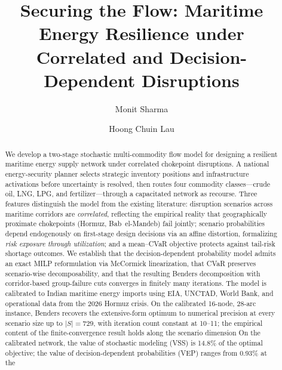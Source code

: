 \documentclass[final,3p,authoryear]{elsarticle}
\theoremstyle{definition}
\begin{document}
\begin{frontmatter}

\title{Securing the Flow: Maritime Energy Resilience under Correlated and Decision-Dependent Disruptions}

\author[addr1]{Monit Sharma}

\author[addr1]{Hoong Chuin Lau}

\address[addr1]{School of Computing and Information Systems,  Singapore Management University, Singapore}


\begin{abstract}
We develop a two-stage stochastic multi-commodity flow model for
designing a resilient maritime energy supply network under correlated
chokepoint disruptions. A national energy-security planner selects
strategic inventory positions and infrastructure activations before
uncertainty is resolved, then routes four commodity classes—crude oil,
LNG, LPG, and fertilizer—through a capacitated network as recourse.
Three features distinguish the model from the existing literature:
disruption scenarios across maritime corridors are \emph{correlated},
reflecting the empirical reality that geographically proximate
chokepoints (Hormuz, Bab~el-Mandeb) fail jointly; scenario probabilities
depend endogenously on first-stage design decisions via an affine
distortion, formalizing \emph{risk exposure through utilization}; and a
mean--CVaR objective protects against tail-risk shortage outcomes.
We establish that the decision-dependent probability model admits an
exact MILP reformulation via McCormick linearization, that CVaR
preserves scenario-wise decomposability, and that the resulting Benders
decomposition with corridor-based group-failure cuts converges in
finitely many iterations. The model is calibrated to Indian maritime
energy imports using EIA, UNCTAD, World Bank, and operational data from
the 2026 Hormuz crisis. On the calibrated 16-node, 28-arc instance, Benders recovers the extensive-form optimum to numerical precision at every scenario size up to $|S|=729$, with iteration count constant at 10--11; the empirical content of the finite-convergence result holds along the scenario dimension On the calibrated network, the value of stochastic modeling (VSS) is 14.8\% of the optimal objective; the value of
decision-dependent probabilities (VEP) ranges from 0.93\% at the

\end{abstract}
\end{frontmatter}
\end{document}
